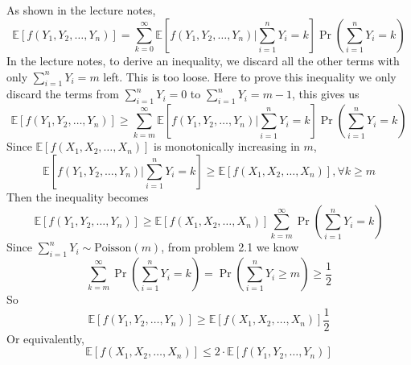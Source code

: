 \documentclass[12pt,letterpaper]{article}
\begin{document}
\subsection{}
As shown in the lecture notes,
$$\mathbb{E}\left[f(Y_1,Y_2,\dots,Y_n)\right]=
\sum_{k=0}^{\infty}\mathbb{E}\left[f(Y_1,Y_2,\dots,Y_n)\bigg|
\sum_{i=1}^{n}Y_i=k\right]
\Pr(\sum_{i=1}^{n}Y_i=k)$$
In the lecture notes, to derive an inequality,
we discard all the other terms with only 
$\sum_{i=1}^{n}Y_i=m$ left.
This is too loose.
Here to prove this inequality we only discard 
the terms from $\sum_{i=1}^{n}Y_i=0$ to $\sum_{i=1}^{n}Y_i=m-1$,
this gives us 
$$\mathbb{E}\left[f(Y_1,Y_2,\dots,Y_n)\right]\geq
\sum_{k=m}^{\infty}\mathbb{E}\left[f(Y_1,Y_2,\dots,Y_n)\bigg|
\sum_{i=1}^{n}Y_i=k\right]
\Pr(\sum_{i=1}^{n}Y_i=k)$$ 
Since $\mathbb{E}\left[f(X_1,X_2,\dots,X_n)\right]$ is monotonically increasing in $m$,
$$\mathbb{E}\left[f(Y_1,Y_2,\dots,Y_n)\bigg|
\sum_{i=1}^{n}Y_i=k\right]\geq \mathbb{E}\left[f(X_1,X_2,\dots,X_n)\right], \forall k\geq m$$
Then the inequality becomes 
$$\mathbb{E}\left[f(Y_1,Y_2,\dots,Y_n)\right]\geq
\mathbb{E}\left[f(X_1,X_2,\dots,X_n)\right]
\sum_{k=m}^{\infty}\Pr(\sum_{i=1}^{n}Y_i=k)$$ 
Since $\sum_{i=1}^{n}Y_i\sim \text{Poisson}(m)$,
from problem 2.1 we know 
$$\sum_{k=m}^{\infty}\Pr(\sum_{i=1}^{n}Y_i=k)
=\Pr(\sum_{i=1}^{n}Y_i\geq m)\geq\frac{1}{2}$$
So $$\mathbb{E}\left[f(Y_1,Y_2,\dots,Y_n)\right]\geq
\mathbb{E}\left[f(X_1,X_2,\dots,X_n)\right]\frac{1}{2}$$
Or equivalently,
$$\mathbb{E}\left[f(X_1,X_2,\dots,X_n)\right]\leq 
2\cdot\mathbb{E}\left[f(Y_1,Y_2,\dots,Y_n)\right]$$ 
\subsection{}
\end{document}
